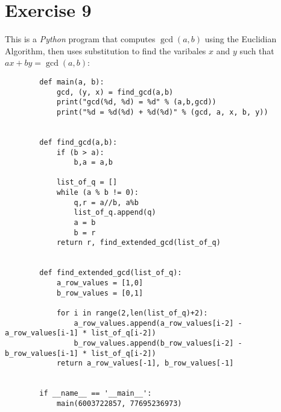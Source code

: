 \documentclass[12pt]{article}
\begin{document}
    \section*{Exercise 9}
    This is a \textit{Python} program that computes $\gcd(a, b)$
    using the Euclidian Algorithm,
    then uses substitution to find the varibales $x$ and $y$
    such that $ax + by = \gcd(a, b)$: \\
    \begin{lstlisting}
        def main(a, b):
            gcd, (y, x) = find_gcd(a,b)
            print("gcd(%d, %d) = %d" % (a,b,gcd))
            print("%d = %d(%d) + %d(%d)" % (gcd, a, x, b, y))
            

        def find_gcd(a,b):
            if (b > a):
                b,a = a,b

            list_of_q = []
            while (a % b != 0):
                q,r = a//b, a%b
                list_of_q.append(q)
                a = b
                b = r
            return r, find_extended_gcd(list_of_q)


        def find_extended_gcd(list_of_q):
            a_row_values = [1,0] 
            b_row_values = [0,1]

            for i in range(2,len(list_of_q)+2):
                a_row_values.append(a_row_values[i-2] - a_row_values[i-1] * list_of_q[i-2])
                b_row_values.append(b_row_values[i-2] - b_row_values[i-1] * list_of_q[i-2])
            return a_row_values[-1], b_row_values[-1]


        if __name__ == '__main__':
            main(6003722857, 77695236973)
    \end{lstlisting}
\end{document}
